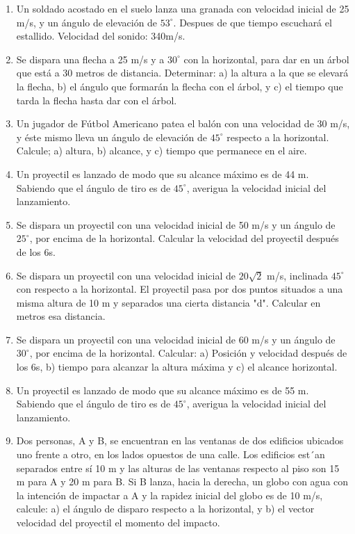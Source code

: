 \begin{enumerate}

 \item Un soldado acostado en el suelo lanza una granada con velocidad inicial de 25 m/s, y un ángulo de elevación de
 $53^\circ$. Despues de que tiempo escuchará el estallido. Velocidad del sonido: 340m/s.
 
 \item Se dispara una flecha a 25 m/s y a $30^\circ$ con la horizontal,
 para dar en un árbol que está a 30 metros de distancia. 
Determinar: a) la altura a la que se elevará
 la flecha,  b) el ángulo que formarán la
 flecha con el árbol, y c) el tiempo que 
tarda la flecha hasta dar con el árbol. 


\item Un jugador de Fútbol Americano patea el balón con una velocidad de 30 m/s, y éste mismo
 lleva un ángulo de elevación de 
$45^\circ
$ respecto a la horizontal. Calcule; a) altura, b) alcance, y c) tiempo que
 permanece en el aire.

\item  Un proyectil es lanzado de modo que su alcance máximo
 es de 44 m. Sabiendo que el ángulo de tiro es de $45^\circ$, 
averigua la velocidad inicial del
 lanzamiento. 

\item Se dispara un proyectil con una velocidad inicial de 50 m/s
 y un ángulo de $25^\circ$, por encima de la horizontal. 
Calcular la velocidad del proyectil después de
 los 6s.

\item Se dispara un proyectil con una velocidad inicial de $20\sqrt{2}$ m/s, inclinada $45^\circ$ con respecto a la horizontal. El proyectil pasa por dos puntos situados a una misma altura de 10 m y separados una cierta distancia "d". Calcular en metros esa distancia. 

\item Se dispara un proyectil con una velocidad inicial de 60 m/s y un ángulo de $30^\circ
$, por encima de
 la horizontal. 
Calcular: a) Posición y velocidad después de los 6s, b) tiempo para alcanzar la altura máxima
 y c) el  alcance horizontal.

\item  Un proyectil es lanzado de modo que su alcance máximo
 es de 55 m. Sabiendo que el ángulo de tiro es de $45^\circ$, 
averigua la velocidad inicial del
 lanzamiento. 

\item Dos personas, A y B, se encuentran en las ventanas de dos edificios ubicados uno frente a
 otro, en los lados opuestos de 
una calle. Los edificios est´an separados entre sí 10 m y las alturas de las
 ventanas respecto al piso son 15 m para A y 20 m 
para B. Si B lanza, hacia la derecha, un globo con agua
 con la intención de impactar a A y la rapidez inicial del globo es de 
10 m/s, calcule: a) el ángulo de disparo
 respecto a la horizontal, y b) el vector velocidad del proyectil el momento del impacto.

\end{enumerate}

